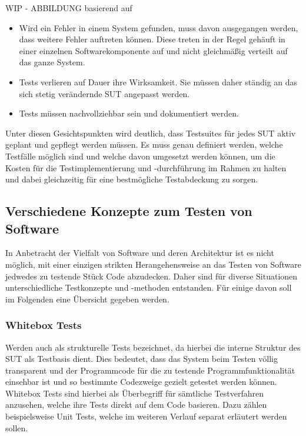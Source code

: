 WIP - ABBILDUNG basierend auf \cite[Fig. 1.3]{desikan:2006}

\begin{itemize}
    \item Wird ein Fehler in einem System gefunden, muss davon ausgegangen werden, dass weitere Fehler auftreten können. Diese treten in der Regel gehäuft in einer einzelnen Softwarekomponente auf und nicht gleichmäßig verteilt auf das ganze System. \cite[S. 13]{witte:2019}
    \item Tests verlieren auf Dauer ihre Wirksamkeit. Sie müssen daher ständig an das sich stetig verändernde \ac{SUT} angepasst werden. \cite[S. 13f.]{witte:2019}
    \item Tests müssen nachvollziehbar sein und dokumentiert werden. \cite[S. 14f.]{witte:2019}
\end{itemize}

Unter diesen Gesichtspunkten wird deutlich, dass Testsuites für jedes \ac{SUT} aktiv geplant und gepflegt werden müssen. Es muss genau definiert werden, welche Testfälle möglich sind und welche davon umgesetzt werden können, um die Kosten für die Testimplementierung und -durchführung im Rahmen zu halten und dabei gleichzeitig für eine bestmögliche Testabdeckung zu sorgen.

\subsection{Verschiedene Konzepte zum Testen von Software}\label{subsec:testkonzepte}
In Anbetracht der Vielfalt von Software und deren Architektur ist es nicht möglich, mit einer einzigen strikten Herangehensweise an das Testen von Software jedwedes zu testende Stück Code abzudecken. Daher sind für diverse Situationen unterschiedliche Testkonzepte und -methoden entstanden. Für einige davon soll im Folgenden eine Übersicht gegeben werden.

\subsubsection*{Whitebox Tests}\label{subsubsec:whitebox}
Werden auch als strukturelle Tests bezeichnet, da hierbei die interne Struktur des \ac{SUT} als Testbasis dient. Dies bedeutet, dass das System beim Testen völlig transparent und der Programmcode für die zu testende Programmfunktionalität einsehbar ist und so bestimmte Codezweige gezielt getestet werden können. \cite[S. 125f.]{oregan:2019} Whitebox Tests sind hierbei als Überbegriff für sämtliche Testverfahren anzusehen, welche ihre Tests direkt auf dem Code basieren. Dazu zählen beispielsweise Unit Tests, welche im weiteren Verlauf separat erläutert werden sollen. 

